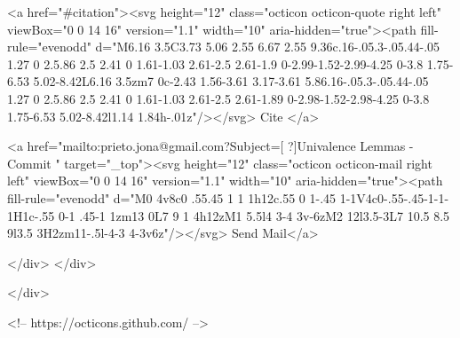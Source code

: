      <a  href="#citation"><svg height="12" class="octicon octicon-quote right left" viewBox="0 0 14 16" version="1.1" width="10" aria-hidden="true"><path fill-rule="evenodd" d="M6.16 3.5C3.73 5.06 2.55 6.67 2.55 9.36c.16-.05.3-.05.44-.05 1.27 0 2.5.86 2.5 2.41 0 1.61-1.03 2.61-2.5 2.61-1.9 0-2.99-1.52-2.99-4.25 0-3.8 1.75-6.53 5.02-8.42L6.16 3.5zm7 0c-2.43 1.56-3.61 3.17-3.61 5.86.16-.05.3-.05.44-.05 1.27 0 2.5.86 2.5 2.41 0 1.61-1.03 2.61-2.5 2.61-1.89 0-2.98-1.52-2.98-4.25 0-3.8 1.75-6.53 5.02-8.42l1.14 1.84h-.01z"/></svg> Cite
      </a>

      <a href="mailto:prieto.jona@gmail.com?Subject=[ ?]Univalence Lemmas - Commit " target="_top"><svg height="12" class="octicon octicon-mail right left" viewBox="0 0 14 16" version="1.1" width="10" aria-hidden="true"><path fill-rule="evenodd" d="M0 4v8c0 .55.45 1 1 1h12c.55 0 1-.45 1-1V4c0-.55-.45-1-1-1H1c-.55 0-1 .45-1 1zm13 0L7 9 1 4h12zM1 5.5l4 3-4 3v-6zM2 12l3.5-3L7 10.5 8.5 9l3.5 3H2zm11-.5l-4-3 4-3v6z"/></svg> Send Mail</a>

    </div>
  </div>

</div>

<!-- https://octicons.github.com/ -->





